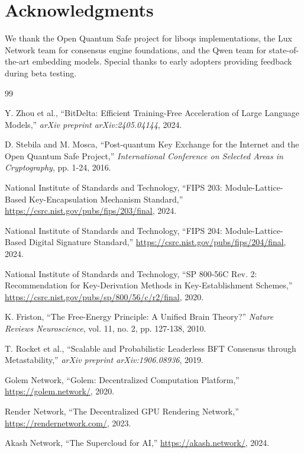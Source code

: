 \section*{Acknowledgments}


We thank the Open Quantum Safe project for liboqs implementations, the Lux Network team for consensus engine foundations, and the Qwen team for state-of-the-art embedding models. Special thanks to early adopters providing feedback during beta testing.


\begin{thebibliography}{99}

Y. Zhou et al., ``BitDelta: Efficient Training-Free Acceleration of Large Language Models,''
\textit{arXiv preprint arXiv:2405.04144}, 2024.

D. Stebila and M. Mosca, ``Post-quantum Key Exchange for the Internet and the Open Quantum Safe Project,''
\textit{International Conference on Selected Areas in Cryptography}, pp. 1-24, 2016.

National Institute of Standards and Technology,
``FIPS 203: Module-Lattice-Based Key-Encapsulation Mechanism Standard,''
\url{https://csrc.nist.gov/pubs/fips/203/final}, 2024.

National Institute of Standards and Technology,
``FIPS 204: Module-Lattice-Based Digital Signature Standard,''
\url{https://csrc.nist.gov/pubs/fips/204/final}, 2024.

National Institute of Standards and Technology,
``SP 800-56C Rev. 2: Recommendation for Key-Derivation Methods in Key-Establishment Schemes,''
\url{https://csrc.nist.gov/pubs/sp/800/56/c/r2/final}, 2020.

K. Friston, ``The Free-Energy Principle: A Unified Brain Theory?''
\textit{Nature Reviews Neuroscience}, vol. 11, no. 2, pp. 127-138, 2010.

T. Rocket et al., ``Scalable and Probabilistic Leaderless BFT Consensus through Metastability,''
\textit{arXiv preprint arXiv:1906.08936}, 2019.

Golem Network, ``Golem: Decentralized Computation Platform,''
\url{https://golem.network/}, 2020.

Render Network, ``The Decentralized GPU Rendering Network,''
\url{https://rendernetwork.com/}, 2023.

Akash Network, ``The Supercloud for AI,''
\url{https://akash.network/}, 2024.


\end{thebibliography}
